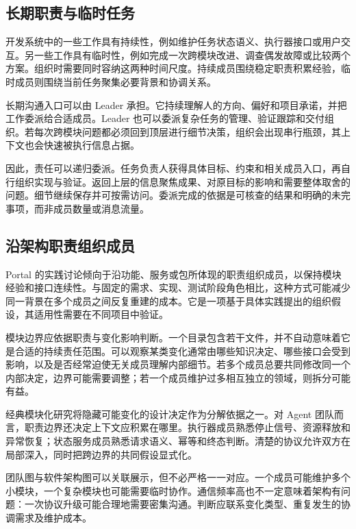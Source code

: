\label{sec:organization}
\subsection{长期职责与临时任务}
开发系统中的一些工作具有持续性，例如维护任务状态语义、执行器接口或用户交互。另一些工作具有临时性，例如完成一次跨模块改进、调查偶发故障或比较两个方案。组织时需要同时容纳这两种时间尺度。持续成员围绕稳定职责积累经验，临时成员则围绕当前任务聚集必要背景和协调关系。

长期沟通入口可以由 Leader 承担。它持续理解人的方向、偏好和项目承诺，并把工作委派给合适成员。Leader 也可以委派复杂任务的管理、验证跟踪和交付组织。若每次跨模块问题都必须回到顶层进行细节决策，组织会出现串行瓶颈，其上下文也会快速被执行信息占据。

因此，责任可以递归委派。任务负责人获得具体目标、约束和相关成员入口，再自行组织实现与验证。返回上层的信息聚焦成果、对原目标的影响和需要整体取舍的问题。细节继续保存并可按需访问。委派完成的依据是可核查的结果和明确的未完事项，而非成员数量或消息流量。

\subsection{沿架构职责组织成员}
Portal 的实践讨论倾向于沿功能、服务或包所体现的职责组织成员，以保持模块经验和接口连续性。与固定的需求、实现、测试阶段角色相比，这种方式可能减少同一背景在多个成员之间反复重建的成本。它是一项基于具体实践提出的组织假设，其适用性需要在不同项目中验证。

模块边界应依据职责与变化影响判断。一个目录包含若干文件，并不自动意味着它是合适的持续责任范围。可以观察某类变化通常由哪些知识决定、哪些接口会受到影响，以及是否经常迫使无关成员理解内部细节。若多个成员总要共同修改同一个内部决定，边界可能需要调整；若一个成员维护过多相互独立的领域，则拆分可能有益。

经典模块化研究将隐藏可能变化的设计决定作为分解依据之一\cite{parnas1972}。对 Agent 团队而言，职责边界还决定上下文应积累在哪里。执行器成员熟悉停止信号、资源释放和异常恢复；状态服务成员熟悉请求语义、幂等和终态判断。清楚的协议允许双方在局部深入，同时把跨边界的共同假设显式化。


团队图与软件架构图可以关联展示，但不必严格一一对应。一个成员可能维护多个小模块，一个复杂模块也可能需要临时协作。通信频率高也不一定意味着架构有问题：一次协议升级可能合理地需要密集沟通。判断应联系变化类型、重复发生的协调需求及维护成本。

